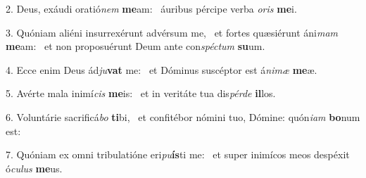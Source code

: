 2. Deus, exáudi oratió\textit{nem} \textbf{me}am: \ast\  áuribus pércipe verba \textit{o}\textit{ris} \textbf{me}i.\

3. Quóniam aliéni insurrexérunt advérsum me, \dag\  et fortes quæsiérunt áni\textit{mam} \textbf{me}am: \ast\  et non proposuérunt Deum ante con\textit{spéc}\textit{tum} \textbf{su}um.\

4. Ecce enim Deus ád\textit{ju}\textbf{vat} me: \ast\  et Dóminus suscéptor est á\textit{ni}\textit{mæ} \textbf{me}æ.\

5. Avérte mala inimí\textit{cis} \textbf{me}is: \ast\  et in veritáte tua dis\textit{pér}\textit{de} \textbf{il}los.\

6. Voluntárie sacrificá\textit{bo} \textbf{ti}bi, \ast\  et confitébor nómini tuo, Dómine: quón\textit{i}\textit{am} \textbf{bo}num est:\

7. Quóniam ex omni tribulatióne eri\textit{pu}\textbf{ís}ti me: \ast\  et super inimícos meos despéxit ó\textit{cu}\textit{lus} \textbf{me}us.\

